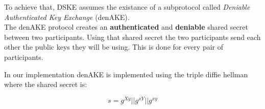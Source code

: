 \begin{frame}
  To achieve that, DSKE assumes the existance of a subprotocol called \emph{Deniable Authenticated Key Exchange} (denAKE).\\[0.3cm]

  The denAKE protocol creates an {\bf authenticated} and {\bf deniable} shared secret between two participants. Using that shared secret the two participants send each other the public keys they will be using. This is done for every pair of participants.\\[0.3cm]

  \begin{minipage}{.47\textwidth}
    In our implementation denAKE is implemented using the triple diffie hellman where the shared secret is:

    \[
      s = g^{Xy} || g^{xY} || g^{xy}
    \]

  \end{minipage}
  \begin{minipage}{.47\textwidth}
     \begin{figure}
      \scalebox{0.5}{ }
    \end{figure}
  \end{minipage}
\end{frame}

\begin{frame}
  \begin{figure}
    \scalebox{0.39}{}
  \end{figure}
\end{frame}
